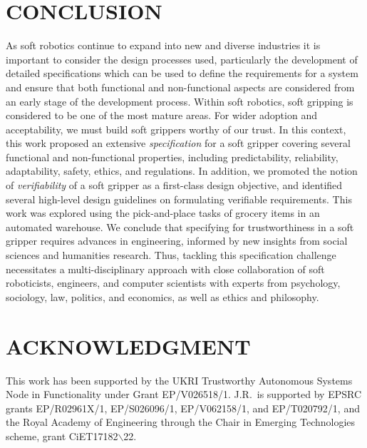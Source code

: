 \documentclass[letterpaper, 10 pt, conference]{ieeeconf}  %
\begin{document}
\section{CONCLUSION} \label{summary-conclusions}%
	As soft robotics continue to expand into new and diverse industries it is important to consider the design processes used, particularly the development of detailed specifications which can be used to define the requirements for a system and ensure that both functional and non-functional aspects are considered from an early stage of the development process.
	Within soft robotics, soft gripping is considered to be one of the most mature areas. 
	For wider adoption and acceptability, we must build soft grippers worthy of our trust. 
	In this context, this work proposed an extensive \emph{specification} for a soft gripper covering several functional and non-functional properties, including predictability, reliability, adaptability, safety, ethics, and regulations.
	In addition, we promoted the notion of \emph{verifiability} of a soft gripper as a first-class design objective, and identified several high-level design guidelines on formulating verifiable requirements. 
	This work was explored using the pick-and-place tasks of grocery items in an automated warehouse. 
	We conclude that specifying for trustworthiness in a soft gripper requires advances in engineering, informed by new insights from social sciences and humanities research. Thus, tackling this specification challenge necessitates a multi-disciplinary approach with close collaboration of soft roboticists, engineers, and computer scientists with experts from psychology, sociology, law, politics, and economics, as well as ethics and philosophy.
	
	\addtolength{\textheight}{-12cm}   %
	
	
	\section*{ACKNOWLEDGMENT}
	This work has been supported by the UKRI Trustworthy Autonomous Systems Node in Functionality under Grant EP/V026518/1. J.R.\ is supported by EPSRC grants EP/R02961X/1, EP/S026096/1, EP/V062158/1, and EP/T020792/1, and the Royal Academy of Engineering through the Chair in Emerging Technologies scheme, grant CiET17182$\backslash$22.
	
\end{document}
